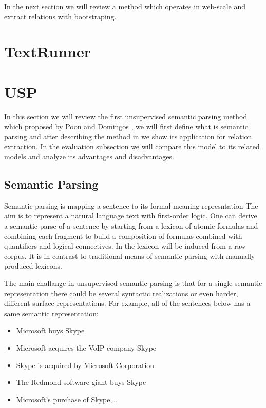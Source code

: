 \documentclass[12pt]{report}
\begin{document}
In the next section we will review a method which operates in web-scale and extract relations with bootstraping.




\section{TextRunner}
\label{ch:unsupervised}

\section{USP}
\label{ch:unsupervised}

In this section we will review the first unsupervised semantic parsing method which proposed by Poon and Domingos \cite{Poon2009},
we will first define what is semantic parsing and after describing the method in \cite{Poon2009} we show its application for relation extraction.
In the evaluation subsection we will compare this model to its related models and analyze its advantages and disadvantages.

\subsection{Semantic Parsing}
\label{ch:definition}

Semantic parsing is mapping a sentence to its formal meaning represntation \cite{Poon2009}
The aim is to represent a natural language text with first-order logic. One can derive a semantic parse of a sentence
by starting from a lexicon of atomic formulas and combining each fragment to build a composition of 
formulas combined with quantifiers and logical connectives. In \cite{Poon2009} 
the lexicon will be induced from a raw corpus. It is in contrast to traditional means of semantic parsing with manually
  produced lexicons.
  
  The main challange in unsupervised semantic parsing is that for a single semantic representation there could be
  several syntactic realizations or even harder, different surface representations. For example, all of the
   sentences below has a same semantic representation:
   \begin{itemize}
     \item Microsoft buys Skype
     \item Microsoft acquires the VoIP company Skype
     \item Skype is acquired by Microsoft Corporation
     \item The Redmond software giant buys Skype
     \item Microsoft’s purchase of Skype,\ldots
   \end{itemize}  
  
\end{document}
